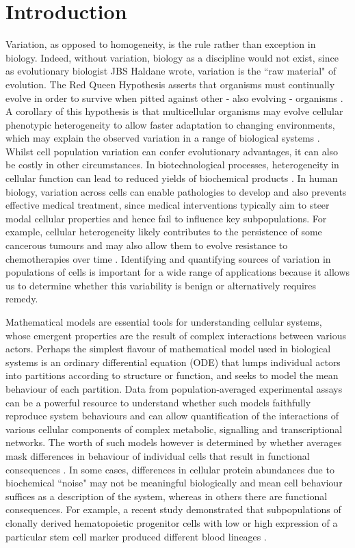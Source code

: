 \section{Introduction}
Variation, as opposed to homogeneity, is the rule rather than exception in biology. Indeed, without variation, biology as a discipline would not exist, since as evolutionary biologist JBS Haldane wrote, variation is the ``raw material" of evolution. The Red Queen Hypothesis asserts that organisms must continually evolve in order to survive when pitted against other - also evolving - organisms \cite{ridley1994red}. A corollary of this hypothesis is that multicellular organisms may evolve cellular phenotypic heterogeneity to allow faster adaptation to changing environments, which may explain the observed variation in a range of biological systems \cite{fraser2009chance}. Whilst cell population variation can confer evolutionary advantages, it can also be costly in other circumstances. In biotechnological processes, heterogeneity in cellular function can lead to reduced yields of biochemical products \cite{delvigne2014metabolic}. In human biology, variation across cells can enable pathologies to develop and also prevents effective medical treatment, since medical interventions typically aim to steer modal cellular properties and hence fail to influence key subpopulations. For example, cellular heterogeneity likely contributes to the persistence of some cancerous tumours \cite{gatenby2007cellular} and may also allow them to evolve resistance to chemotherapies over time \cite{altrock2015mathematics}. Identifying and quantifying sources of variation in populations of cells is important for a wide range of applications because it allows us to determine whether this variability is benign or alternatively requires remedy.

Mathematical models are essential tools for understanding cellular systems, whose emergent properties are the result of complex interactions between various actors. Perhaps the simplest flavour of mathematical model used in biological systems is an ordinary differential equation (ODE) that lumps individual actors into partitions according to structure or function, and seeks to model the mean behaviour of each partition. Data from population-averaged experimental assays can be a powerful resource to understand whether such models faithfully reproduce system behaviours and can allow quantification of the interactions of various cellular components of complex metabolic, signalling and transcriptional networks. The worth of such models however is determined by whether averages mask differences in behaviour of individual cells that result in functional consequences \cite{altschuler2010cellular}. In some cases, differences in cellular protein abundances due to biochemical ``noise" may not be meaningful biologically \cite{elowitz2002stochastic} and mean cell behaviour suffices as a description of the system, whereas in others there are functional consequences. For example, a recent study demonstrated that subpopulations of clonally derived hematopoietic progenitor cells with low or high expression of a particular stem cell marker produced different blood lineages \cite{chang2008transcriptome}.


